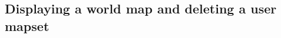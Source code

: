 \documentclass[a4paper,10pt,twoside]{article}
\begin{document}
%

\subsection{Displaying a world map and deleting a user mapset}
\end{document}
